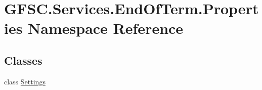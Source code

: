 \hypertarget{namespace_g_f_s_c_1_1_services_1_1_end_of_term_1_1_properties}{}\section{G\+F\+S\+C.\+Services.\+End\+Of\+Term.\+Properties Namespace Reference}
\label{namespace_g_f_s_c_1_1_services_1_1_end_of_term_1_1_properties}
\subsection*{Classes}
\begin{DoxyCompactItemize}
\item 
class \mbox{\hyperlink{class_g_f_s_c_1_1_services_1_1_end_of_term_1_1_properties_1_1_settings}{Settings}}
\end{DoxyCompactItemize}

